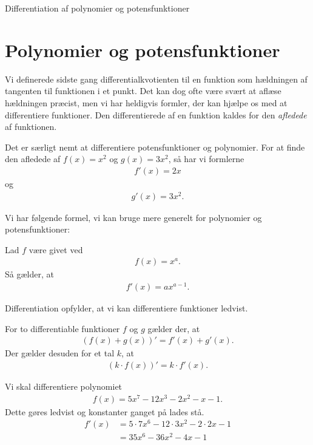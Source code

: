 
\begin{center}
\Huge
Differentiation af polynomier og potensfunktioner
\end{center}
\section*{Polynomier og potensfunktioner}

Vi definerede sidste gang differentialkvotienten til en funktion som hældningen af tangenten til funktionen i et punkt. Det kan dog ofte være svært at aflæse hældningen præcist, men vi har heldigvis formler, der kan hjælpe os med at differentiere funktioner. Den differentierede af en funktion kaldes for den \textit{afledede} af funktionen. 

\begin{exa}
	Det er særligt nemt at differentiere potensfunktioner og polynomier. For at finde den afledede af $f(x) = 
	x^2$ og $g(x) = 3x^2$, så har vi formlerne
	\begin{align*}
		f'(x) = 2x
	\end{align*}
	og 
	\begin{align*}
		g'(x) = 3x^2.
	\end{align*}
\end{exa}

Vi har følgende formel, vi kan bruge mere generelt for polynomier og potensfunktioner:

\begin{setn}
	Lad $f$ være givet ved
	\begin{align*}
		f(x) = x^a.
	\end{align*}
	Så gælder, at 
	\begin{align*}
		f'(x) = ax^{a-1}.
	\end{align*}
\end{setn}

Differentiation opfylder, at vi kan differentiere funktioner ledvist.
\begin{setn}[Linearitet]
	For to differentiable funktioner $f$ og $g$ gælder der, at 
	\begin{align*}
		(f(x)+g(x))' = f'(x) + g'(x).
	\end{align*}
	Der gælder desuden for et tal $k$, at
	\begin{align*}
		(k\cdot f(x) )' = k\cdot f'(x).
	\end{align*}
\end{setn}

\begin{exa}
	Vi skal differentiere polynomiet 
	\begin{align*}
		f(x) = 5x^7-12x^3-2x^2-x-1.
	\end{align*}
	Dette gøres ledvist og konstanter ganget på lades stå.
	\begin{align*}
		f'(x) &= 5\cdot 7x^6 - 12\cdot 3x^2-2\cdot 2x-1\\
		&= 35x^6-36x^2-4x-1
	\end{align*}
\end{exa}

